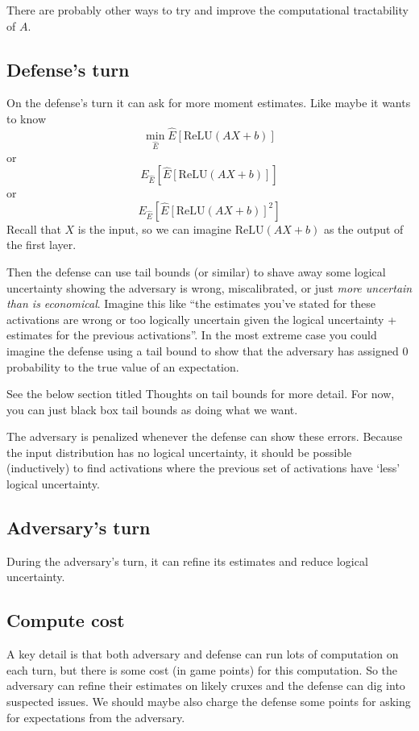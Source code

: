\documentclass{pset}
\begin{document}
There are probably other ways to try and improve the computational tractability of $A$.

\subsection{Defense's turn}

On the defense's turn it can ask for more moment estimates.
Like maybe it wants to know 
\[\min_{\hat{E}} \hat{E}[\mathrm{ReLU}(A X + b)]\]
or
\[E_{\hat{E}}[ \hat{E}[\mathrm{ReLU}(A X + b)]]\]
or
\[E_{\hat{E}}[ \hat{E}[\mathrm{ReLU}(A X + b)]^2]\]
Recall that $X$ is the input, so we can imagine $\mathrm{ReLU}(A X + b)$ as the
output of the first layer.

Then the defense can use tail bounds (or similar) to shave away some logical
uncertainty showing the adversary is wrong, miscalibrated, or just \textit{more
uncertain than is economical}. Imagine this like ``the estimates you've stated
for these activations are wrong or too logically uncertain given the logical
uncertainty + estimates for the previous activations''. In the most extreme
case you could imagine the defense using a tail bound to show that the
adversary has assigned 0 probability to the true value of an expectation.

See the below section titled Thoughts on tail bounds for more detail.
For now, you can just black box tail bounds as doing what we want.

The adversary is penalized whenever the defense can show these errors. Because
the input distribution has no logical uncertainty, it should be possible
(inductively) to find activations where the previous set of activations have
`less' logical uncertainty.

\subsection{Adversary's turn}

During the adversary's turn, it can refine its estimates and reduce logical uncertainty.

\subsection{Compute cost}

A key detail is that both adversary and defense can run lots of computation on
each turn, but there is some cost (in game points) for this computation. So the
adversary can refine their estimates on likely cruxes and the defense can dig
into suspected issues. We should maybe also charge the defense some points for
asking for expectations from the adversary.
\end{document}
